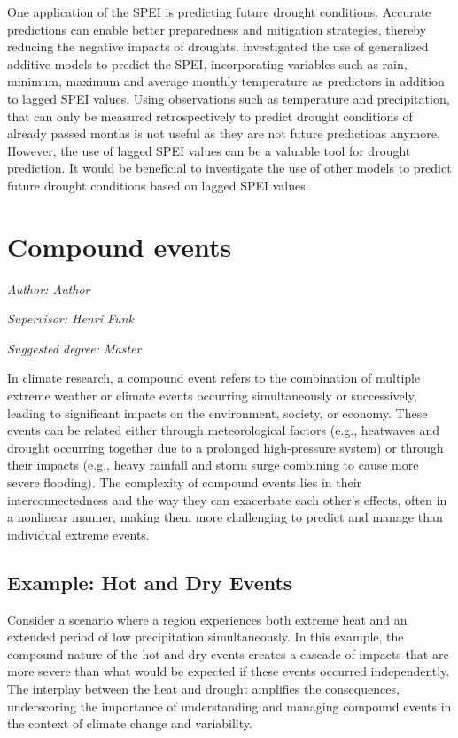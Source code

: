 \documentclass[
]{krantz}
\begin{document}
One application of the SPEI is predicting future drought conditions. Accurate predictions can enable better preparedness and mitigation strategies, thereby reducing the negative impacts of droughts. \citet{mathivha2020} investigated the use of generalized additive models to predict the SPEI, incorporating variables such as rain, minimum, maximum and average monthly temperature as predictors in addition to lagged SPEI values.
Using observations such as temperature and precipitation, that can only be measured retrospectively to predict drought conditions of already passed months is not useful as they are not future predictions anymore. However, the use of lagged SPEI values can be a valuable tool for drought prediction.
It would be beneficial to investigate the use of other models to predict future drought conditions based on lagged SPEI values.

\chapter{Compound events}\label{ce}

\emph{Author: Author}

\emph{Supervisor: Henri Funk}

\emph{Suggested degree: Master}

In climate research, a compound event refers to the combination of multiple extreme weather or climate events occurring simultaneously or successively, leading to significant impacts on the environment, society, or economy. These events can be related either through meteorological factors (e.g., heatwaves and drought occurring together due to a prolonged high-pressure system) or through their impacts (e.g., heavy rainfall and storm surge combining to cause more severe flooding). The complexity of compound events lies in their interconnectedness and the way they can exacerbate each other's effects, often in a nonlinear manner, making them more challenging to predict and manage than individual extreme events.

\section{Example: Hot and Dry Events}\label{example-hot-and-dry-events}

Consider a scenario where a region experiences both extreme heat and an extended period of low precipitation simultaneously. In this example, the compound nature of the hot and dry events creates a cascade of impacts that are more severe than what would be expected if these events occurred independently. The interplay between the heat and drought amplifies the consequences, underscoring the importance of understanding and managing compound events in the context of climate change and variability.
\citet{zscheischler}
\end{document}

